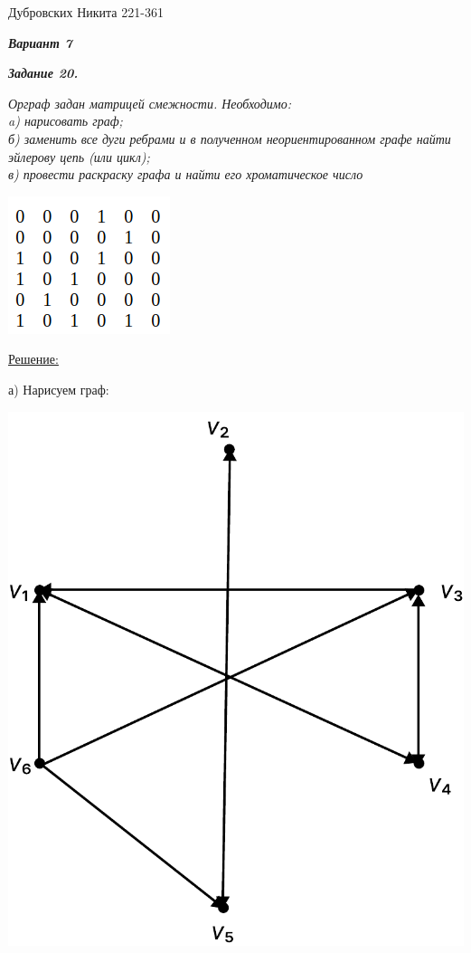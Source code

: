 \documentclass[12pt]{article}
\begin{document}
Дубровских Никита 221-361

\textit{\textbf{Вариант 7}}

\textit{\textbf{Задание 20.}}

\textit{Орграф задан матрицей смежности. Необходимо:}\\
\textit{a) нарисовать граф;}\\
\textit{б) заменить все дуги ребрами и в полученном неориентированном графе найти
эйлерову цепь (или цикл);}\\
\textit{в) провести раскраску графа и найти его хроматическое число}\\

\begin{center}
	\includegraphics[scale=.8]{20.png}
\end{center}

\underline{Решение:}

а) Нарисуем граф:

\begin{center}
	\includegraphics[scale=.8]{20_1.pdf}
\end{center}
\end{document}
